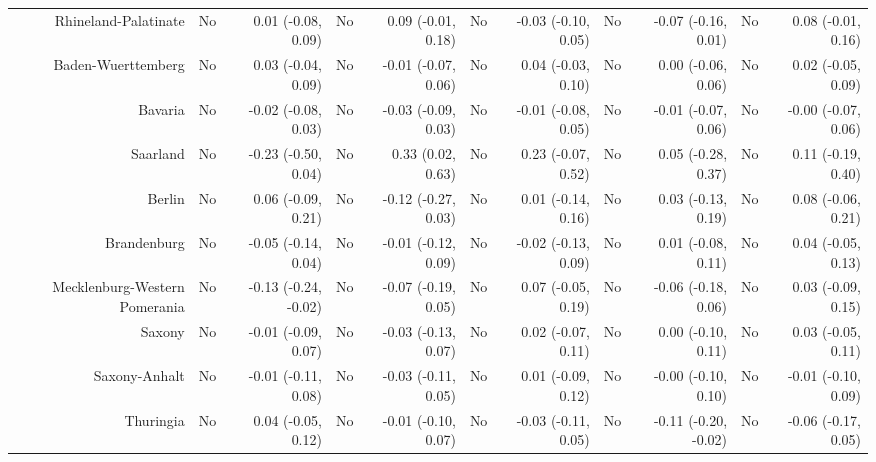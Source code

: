 \documentclass[
  man,floatsintext]{apa6}
\newenvironment{lltable}{\begin{landscape}\centering\begin{ThreePartTable}}{\end{ThreePartTable}\end{landscape}}
\begin{document}
\begin{lltable}
{\begin{longtable}{rrrrrrrrrrr}
Rhineland-Palatinate & No & 0.01 (-0.08, 0.09) & No & 0.09 (-0.01, 0.18) & No & -0.03 (-0.10, 0.05) & No & -0.07 (-0.16, 0.01) & No & 0.08 (-0.01, 0.16)\\
Baden-Wuerttemberg & No & 0.03 (-0.04, 0.09) & No & -0.01 (-0.07, 0.06) & No & 0.04 (-0.03, 0.10) & No & 0.00 (-0.06, 0.06) & No & 0.02 (-0.05, 0.09)\\
Bavaria & No & -0.02 (-0.08, 0.03) & No & -0.03 (-0.09, 0.03) & No & -0.01 (-0.08, 0.05) & No & -0.01 (-0.07, 0.06) & No & -0.00 (-0.07, 0.06)\\
Saarland & No & -0.23 (-0.50, 0.04) & No & 0.33 (0.02, 0.63) & No & 0.23 (-0.07, 0.52) & No & 0.05 (-0.28, 0.37) & No & 0.11 (-0.19, 0.40)\\
Berlin & No & 0.06 (-0.09, 0.21) & No & -0.12 (-0.27, 0.03) & No & 0.01 (-0.14, 0.16) & No & 0.03 (-0.13, 0.19) & No & 0.08 (-0.06, 0.21)\\
Brandenburg & No & -0.05 (-0.14, 0.04) & No & -0.01 (-0.12, 0.09) & No & -0.02 (-0.13, 0.09) & No & 0.01 (-0.08, 0.11) & No & 0.04 (-0.05, 0.13)\\
Mecklenburg-Western Pomerania & No & -0.13 (-0.24, -0.02) & No & -0.07 (-0.19, 0.05) & No & 0.07 (-0.05, 0.19) & No & -0.06 (-0.18, 0.06) & No & 0.03 (-0.09, 0.15)\\
Saxony & No & -0.01 (-0.09, 0.07) & No & -0.03 (-0.13, 0.07) & No & 0.02 (-0.07, 0.11) & No & 0.00 (-0.10, 0.11) & No & 0.03 (-0.05, 0.11)\\
Saxony-Anhalt & No & -0.01 (-0.11, 0.08) & No & -0.03 (-0.11, 0.05) & No & 0.01 (-0.09, 0.12) & No & -0.00 (-0.10, 0.10) & No & -0.01 (-0.10, 0.09)\\
Thuringia & No & 0.04 (-0.05, 0.12) & No & -0.01 (-0.10, 0.07) & No & -0.03 (-0.11, 0.05) & No & -0.11 (-0.20, -0.02) & No & -0.06 (-0.17, 0.05)\\
\bottomrule
\end{longtable}

}

\end{lltable}
\end{document}
